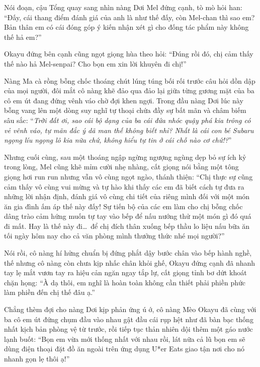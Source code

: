 \documentclass[../main.tex]{subfiles}
\begin{document}
Nói đoạn, cậu Tổng quay sang nhìn nàng Dơi Mel đứng cạnh, tò mò hỏi han: ``Đấy, cái thang điểm đánh giá của anh là như thế đấy, còn Mel-chan thì sao em? Bản thân em có cái đóng góp ý kiến nhận xét gì cho đống tác phẩm này không thế hả em?''

Okayu đứng bên cạnh cũng ngọt giọng hùa theo hỏi: ``Đúng rồi đó, chị cảm thấy thế nào hả Mel-senpai? Cho bọn em xin lời khuyên đi chị!''

Nàng Ma cà rồng bỗng chốc thoáng chút lúng túng bối rối trước câu hỏi dồn dập của mọi người, đôi mắt cô nàng khẽ đảo qua đảo lại giữa từng gương mặt của ba cô em út đang đứng vênh váo chờ đợi khen ngợi. Trong đầu nàng Dơi lúc này bỗng vang lên một dòng suy nghĩ tự thoại chứa đầy sự bất mãn và châm biếm sâu sắc: ``\textit{Trời đất ơi, sao cái bộ dạng của ba cái đứa nhóc quậy phá kia trông có vẻ vênh váo, tự mãn đắc ý dã man thế không biết nhỉ? Nhất là cái con bé Subaru ngọng líu ngọng lô kia nữa chứ, không hiểu tự tin ở cái chỗ nào cơ chứ!?}''


Nhưng cuối cùng, sau một thoáng ngập ngừng ngượng ngùng dẹp bỏ sự ích kỷ trong lòng, Mel cũng khẽ mỉm cười nhẹ nhàng, cất giọng nói bằng một tông giọng hơi run run nhưng vẫn vô cùng ngọt ngào, thánh thiện: ``Chị thực sự cũng cảm thấy vô cùng vui mừng và tự hào khi thấy các em đã biết cách tự đưa ra những lời nhận định, đánh giá vô cùng chi tiết của riêng mình đối với một món ăn gia đình ấm áp thế này đấy! Sự tiến bộ của các em làm cho chị bỗng chốc dâng trào cảm hứng muốn tự tay vào bếp để nấu nướng thử một món gì đó quá đi mất. Hay là thế này đi\dots\ để chị đích thân xuống bếp thầu lo liệu nấu bữa ăn tối ngày hôm nay cho cả văn phòng mình thưởng thức nhé mọi người?''

Nói rồi, cô nàng hí hửng chuẩn bị đứng phắt dậy bước chân vào bếp hành nghề, thế nhưng cô nàng còn chưa kịp nhấc chân khỏi ghế, Okayu đứng cạnh đã nhanh tay lẹ mắt vươn tay ra hiệu cản ngăn ngay tắp lự, cất giọng tỉnh bơ dứt khoát chặn họng: ``À dạ thôi, em nghĩ là hoàn toàn không cần thiết phải phiền phức làm phiền đến chị thế đâu ạ.''

Chẳng thèm đợi cho nàng Dơi kịp phản ứng ú ớ, cô nàng Mèo Okayu đã cùng với ba cô em út đứng chụm đầu vào nhau gật đầu cái rụp hệt như đã bàn bạc thống nhất kịch bản phòng vệ từ trước, rồi tiếp tục thản nhiên dội thêm một gáo nước lạnh buốt: ``Bọn em vừa mới thống nhất với nhau rồi, lát nữa cả lũ bọn em sẽ dùng điện thoại đặt đồ ăn ngoài trên ứng dụng U*er Eats giao tận nơi cho nó nhanh gọn lẹ thôi ạ!''
\end{document}
